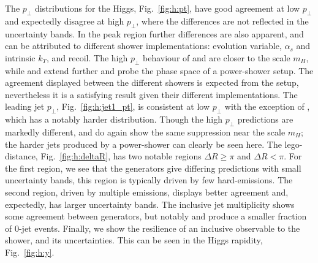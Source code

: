 The $p_\perp$ distributions for the Higgs, Fig.~\ref{fig:h:pt}, have good agreement at low $p_\perp$ and expectedly disagree at high $p_\perp$, where the differences are not reflected in the uncertainty bands. In the peak region further differences are also apparent, and can be attributed to different shower implementations: evolution variable, $\alpha_s$ and intrinsic $k_T$, and recoil. The high $p_\perp$ behaviour of \Herwig and \Sherpa \CSS are closer to the scale $m_H$, while \Pythia and \Sherpa \Dire extend further and probe the phase space of a power-shower setup. The agreement displayed between the different \Herwig showers is expected from the setup, nevertheless it is a satisfying result given their different implementations.
The leading jet $p_\perp$, Fig.~\ref{fig:h:jet1_pt}, is consistent at low $p_\perp$ with the exception of \Pythia, which has a notably harder distribution. Though the high $p_\perp$ predictions are markedly different, \Herwig and \Sherpa \CSS do again show the same suppression near the scale $m_H$; the harder jets produced by a power-shower can clearly be seen here.
The lego-distance, Fig.~\ref{fig:h:deltaR}, has two notable regions $\Delta R \geq\pi$ and $\Delta R < \pi$. For the first region, we see that the generators give differing predictions with small uncertainty bands, this region is typically driven by few hard-emissions. The second region, driven by multiple emissions, displays better agreement and, expectedly, has larger uncertainty bands.
The inclusive jet multiplicity shows some agreement between generators, but notably \Sherpa \CSS and \Pythia produce a smaller fraction of $0$-jet events. Finally, we show the resilience of an inclusive observable to the shower, and its uncertainties. This can be seen in the Higgs rapidity, Fig.~\ref{fig:h:y}.


